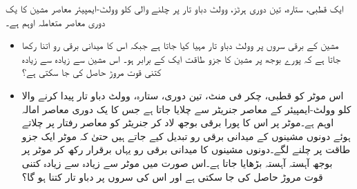 ایک  قطبی، ستارہ، تین دوری  ہرٹز،  وولٹ دباو تار  پر چلنے والی  کلو وولٹ-ایمپیئر  معاصر مشین کا یک دوری  معاصر  متعاملہ   اوہم ہے۔
\begin{itemize}
\item
مشین کے برقی سروں پر  وولٹ دباو تار مہیا کیا جاتا ہے جبکہ اس کا میدانی برقی رو اتنا رکھا جاتا ہے کہ پورے بوجھ پر مشین کا جزو طاقت ایک کے برابر ہو۔ اس مشین سے زیادہ سے زیادہ کتنی قوت مروڑ حاصل کی جا سکتی ہے؟
\item
اس موٹر کو    قطبی،   چکر فی منٹ، تین دوری، ستارہ،   وولٹ دباو تار پیدا کرنے والا   کلو وولٹ-ایمپیئر کے معاصر جنریٹر سے چلایا جاتا ہے جس کا یک دوری معاصر امالہ  اوہم ہے۔موٹر پر اس کا پورا برقی بوجھ لاد  کر جنریٹر کو معاصر رفتار پر چلاتے ہوئے دونوں مشینوں کے میدانی برقی رو تبدیل کیے جاتے ہیں حتیٰ کہ موٹر ایک جزو طاقت پر چلنے لگے۔دونوں مشینوں کا میدانی برقی رو یہاں برقرار رکھ کر موٹر پر بوجھ آہستہ آہستہ بڑھایا جاتا ہے۔اس صورت میں موٹر سے زیادہ سے زیادہ کتنی قوت مروڑ  حاصل کی جا سکتی ہے اور اس کی سروں پر دباو تار کتنا ہو گا؟ 
\end{itemize}


